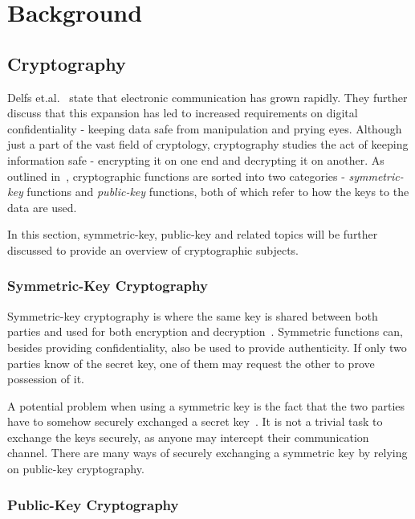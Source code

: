 \chapter{Background}
\label{chapter:background}

\section{Cryptography}

Delfs et.al.~\cite{delfs2007} state that electronic communication has grown rapidly. They further discuss that this expansion has led to increased requirements on digital confidentiality - keeping data safe from manipulation and prying eyes. Although just a part of the vast field of cryptology, cryptography studies the act of keeping information safe - encrypting it on one end and decrypting it on another. As outlined in~\cite{bernstein2017}, cryptographic functions are sorted into two categories - \textit{symmetric-key} functions and \textit{public-key} functions, both of which refer to how the keys to the data are used.

In this section, symmetric-key, public-key and related topics will be further discussed to provide an overview of cryptographic subjects.

\subsection{Symmetric-Key Cryptography}

Symmetric-key cryptography is where the same key is shared between both parties and used for both encryption and decryption~\cite{bernstein2017}. Symmetric functions can, besides providing confidentiality, also be used to provide authenticity. If only two parties know of the secret key, one of them may request the other to prove possession of it.

A potential problem when using a symmetric key is the fact that the two parties have to somehow securely exchanged a secret key~\cite{delfs2007}. It is not a trivial task to exchange the keys securely, as anyone may intercept their communication channel. There are many ways of securely exchanging a symmetric key by relying on public-key cryptography.

\subsection{Public-Key Cryptography}
\label{section:background:public-key-cryptography}

